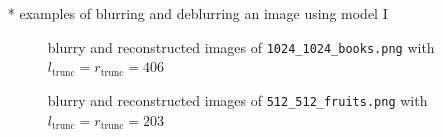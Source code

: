 \begin{enumerate}
\begin{table}[H]
\end{table}
\item[*] examples of blurring and deblurring an image using model I
\begin{figure}[H]
    \centering
    \caption{blurry and reconstructed images of \lstinline{1024_1024_books.png} with $l_{\text{trunc}} = r_{\text{trunc}} = 406$}
\end{figure}
\begin{figure}[H]
    \centering
    \caption{blurry and reconstructed images of \lstinline{512_512_fruits.png} with $l_{\text{trunc}} = r_{\text{trunc}} = 203$}
\end{figure}
\end{enumerate}
